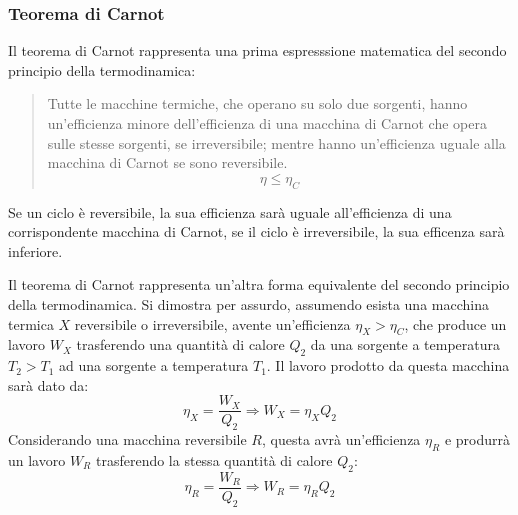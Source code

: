 \documentclass{article}
\numberwithin{equation}{subsection}
\begin{document}
\subsubsection{Teorema di Carnot}
Il teorema di Carnot rappresenta una prima espresssione matematica del secondo principio della termodinamica: 
\begin{quotation}
    Tutte le macchine termiche, che operano su solo due sorgenti, hanno un'efficienza minore dell'efficienza di una macchina di Carnot che opera sulle stesse sorgenti, 
    se irreversibile; mentre hanno un'efficienza uguale alla macchina di Carnot se sono reversibile. 
    \begin{equation}
        \eta\leq\eta_C
    \end{equation}
\end{quotation}
Se un ciclo è reversibile, la sua efficienza sarà uguale all'efficienza di una corrispondente macchina di Carnot, 
se il ciclo è irreversibile, la sua efficenza sarà inferiore. 


Il teorema di Carnot rappresenta un'altra forma equivalente del secondo principio della termodinamica. Si dimostra per assurdo, assumendo esista una macchina termica $X$ 
reversibile o irreversibile, avente un'efficienza $\eta_X>\eta_C$, che produce 
un lavoro $W_X$ trasferendo una quantità di calore $Q_2$ da una sorgente a temperatura $T_2>T_1$ ad una sorgente a temperatura $T_1$. 
Il lavoro prodotto da questa macchina sarà dato da: 
\begin{equation*}
    \eta_X=\displaystyle\frac{W_X}{Q_2}\Rightarrow W_X=\eta_XQ_2
\end{equation*}
Considerando una macchina reversibile $R$, questa avrà un'efficienza $\eta_R$ e produrrà un lavoro $W_R$ trasferendo la stessa quantità di calore $Q_2$: 
\begin{equation*}
    \eta_R=\displaystyle\frac{W_R}{Q_2}\Rightarrow W_R=\eta_RQ_2
\end{equation*}
\end{document}
